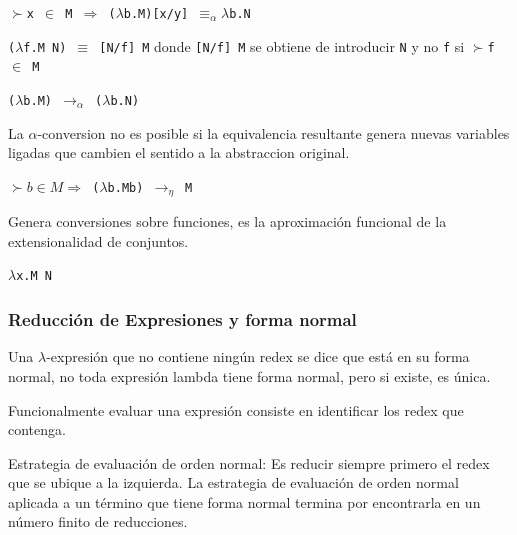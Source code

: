 \begin{defn}\end{defn}

\texttt{$\succ$x $\in$ M $\Rightarrow$ ($\lambda$b.M)[x/y] $\equiv_{\alpha} \lambda$b.N}

\begin{defn}\end{defn}
\texttt{($\lambda$f.M N) $\equiv$ [N/f] M} donde
\texttt{[N/f] M} se obtiene de introducir \texttt{N} y no \texttt{f} si \texttt{$\succ$f $\in$ M}

\begin{defn}\end{defn}
\texttt{($\lambda$b.M) $\rightarrow_{\alpha}$ ($\lambda$b.N)}
 
\begin{note}
La $\alpha$-conversion no es posible si la equivalencia resultante genera nuevas variables ligadas que cambien el sentido a la abstraccion original.
\end{note}

\begin{defn}\end{defn}
\texttt{$\succ b \in M \Rightarrow$ ($\lambda$b.Mb) $\rightarrow_{\eta}$ M}
\begin{note}
Genera conversiones sobre funciones, es la aproximación funcional de la extensionalidad de conjuntos.
\end{note}

\begin{defn}[Redex ]\end{defn}
\texttt{$\lambda$x.M N}

\subsubsection{Reducción de Expresiones y forma normal}

Una $\lambda$-expresión que no contiene ningún redex se dice que está en su forma normal, no toda expresión lambda tiene forma normal, pero si existe, es única.

\begin{note}
Funcionalmente evaluar una expresión consiste en identificar los redex que contenga.
\end{note}

Estrategia de evaluación de orden normal:  
Es reducir siempre primero el redex que se ubique a la izquierda. La estrategia de evaluación de orden normal aplicada a un término que tiene forma normal termina por encontrarla en un número finito de reducciones.

